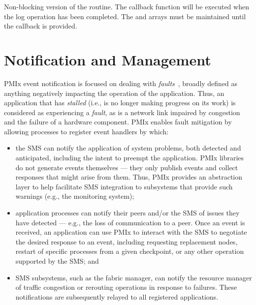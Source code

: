 Non-blocking version of the  routine. The callback function will be executed when the log operation has been completed. The  and  arrays must be maintained until the callback is provided.


\section{Notification and Management}
\label{chap:api_event:notify}

\ac{PMIx} event notification  is focused on dealing with \textit{faults}~\cite{event1,event2}, broadly defined as anything negatively impacting the operation of the application. Thus, an application that has \textit{stalled} (i.e., is no longer making progress on its work) is considered as experiencing a \textit{fault}, as is a network link impaired by congestion and the failure of a hardware component. \ac{PMIx} enables fault mitigation by allowing processes to register event handlers by which:

\begin{itemize}
\item the \ac{SMS} can notify the application of system problems, both detected and anticipated, including the intent to preempt the application. \ac{PMIx} libraries do not generate events themselves --- they only publish events and collect responses that might arise from them. Thus, \ac{PMIx} provides an abstraction layer to help facilitate \ac{SMS} integration to subsystems that provide such warnings (e.g., the monitoring system);

\item application processes can notify their peers and/or the \ac{SMS} of issues they have detected --- e.g., the loss of communication to a peer. Once an event is received, an application can use \ac{PMIx} to interact with the \ac{SMS} to negotiate the desired response to an event, including requesting replacement nodes, restart of specific processes from a given checkpoint, or any other operation supported by the \ac{SMS}; and

\item \ac{SMS} subsystems, such as the fabric manager, can notify the resource manager of traffic congestion or rerouting operations in response to failures. These notifications are subsequently relayed to all registered applications.
\end{itemize}

